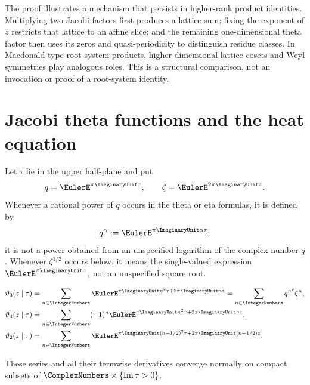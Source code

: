 \begin{remark}
The proof illustrates a mechanism that persists in higher-rank product
identities.  Multiplying two Jacobi factors first produces a lattice sum;
fixing the exponent of $z$ restricts that lattice to an affine slice; and the
remaining one-dimensional theta factor then uses its zeros and
quasi-periodicity to distinguish residue classes.  In Macdonald-type
root-system products, higher-dimensional lattice cosets and Weyl symmetries
play analogous roles.  This is a structural comparison, not an invocation or
proof of a root-system identity.
\end{remark}

\section{Jacobi theta functions and the heat equation}

Let $\tau$ lie in the upper half-plane and put
\[
 q=\EulerE^{\pi\ImaginaryUnit\tau},
 \qquad
 \zeta=\EulerE^{2\pi\ImaginaryUnit z}.
\]
Whenever a rational power of $q$ occurs in the theta or eta formulas, it is
defined by
\[
 q^\alpha:=\EulerE^{\pi\ImaginaryUnit\alpha\tau};
\]
it is not a power obtained from an unspecified logarithm of the complex number
$q$.
Whenever $\zeta^{1/2}$ occurs below, it means the single-valued expression
$\EulerE^{\pi\ImaginaryUnit z}$, not an unspecified square root.

\begin{definition}
\label{qg:def-jacobi-theta}
\begin{align}
 \vartheta_3(z\mid\tau)
  &=\sum_{n\in\IntegerNumbers}
    \EulerE^{\pi\ImaginaryUnit n^2\tau+2\pi\ImaginaryUnit nz}
   =\sum_{n\in\IntegerNumbers}q^{n^2}\zeta^n,
 \label{eq:qg-theta3-definition}\\
 \vartheta_4(z\mid\tau)
  &=\sum_{n\in\IntegerNumbers}(-1)^n
    \EulerE^{\pi\ImaginaryUnit n^2\tau+2\pi\ImaginaryUnit nz},
 \label{eq:qg-theta4-definition}\\
 \vartheta_2(z\mid\tau)
  &=\sum_{n\in\IntegerNumbers}
    \EulerE^{\pi\ImaginaryUnit(n+1/2)^2\tau
      +2\pi\ImaginaryUnit(n+1/2)z}.
 \label{eq:qg-theta2-definition}
\end{align}
\end{definition}

These series and all their termwise derivatives converge normally on compact
subsets of $\ComplexNumbers\times\{\operatorname{Im}\tau>0\}$.

